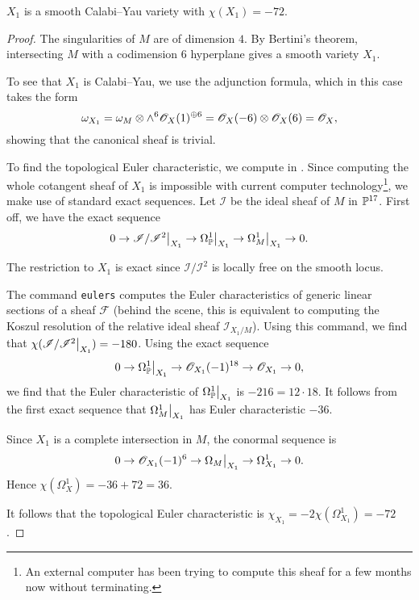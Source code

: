 \begin{proposition}
\label{prop:x1}
$X_1$ is a smooth Calabi--Yau variety with $\chi(X_1)=-72$.
\end{proposition}
\begin{proof}
The singularities of $M$ are of dimension $4$. By Bertini's theorem, intersecting $M$ with a codimension $6$ hyperplane gives a smooth variety $X_1$.

To see that $X_1$ is Calabi--Yau, we use the adjunction formula, which in this case takes the form
\[
\omega_{X_1} = \omega_M \otimes \wedge^6 \OO_X(1)^{\oplus 6}= \OO_X(-6) \otimes \OO_X(6) = \OO_X,
\]
showing that the canonical sheaf is trivial.

To find the topological Euler characteristic, we compute in \MM. Since computing the whole cotangent sheaf of $X_1$ is impossible with current computer technology\footnote{An external computer has been trying to compute this sheaf for a few months now without terminating.}, we make use of standard exact sequences. Let $\mathscr I$ be the ideal sheaf of $M$ in $\P^{17}$. First off, we have the exact sequence
$$
0 \to \restr{\mathscr I/\mathscr I^2}{X_1} \to \restr{\Omega_\P^1}{X_1} \to \restr{\Omega_M^1}{X_1} \to 0.
$$

The restriction to ${X_1}$ is exact since $\mathscr I/\mathscr I^2$ is locally free on the smooth locus.

The \MM command \texttt{eulers} computes the Euler characteristics of generic linear sections of a sheaf $\mathscr F$ (behind the scene, this is equivalent to computing the Koszul resolution of the relative ideal sheaf $\mathscr I_{X_1/M}$). Using this command, we find that $\chi(\restr{\mathscr I/\mathscr I^2}{X_1})=-180$. Using the exact sequence
$$
0 \to \restr{\Omega_\P^1}{X_1} \to \OO_{X_1}(-1)^{18} \to \OO_{X_1} \to 0,
$$
we find that the Euler characteristic of $\restr{\Omega_\P^1}{X_1}$ is $-216=12\cdot 18$. It follows from the first exact sequence that $\restr{\Omega_M^1}{X_1}$ has Euler characteristic $-36$.

Since $X_1$ is a complete intersection in $M$, the conormal sequence is
$$
0 \to \OO_{X_1}(-1)^6 \to \restr{\Omega_M}{X_1}  \to \Omega_{X_1}^1 \to 0.
$$
Hence $\chi(\Omega_X^1) = -36+72 = 36$.

It follows that the topological Euler characteristic is $\chi_{X_1} = -2\chi(\Omega_{X_1}^1)=-72$.
\end{proof}

